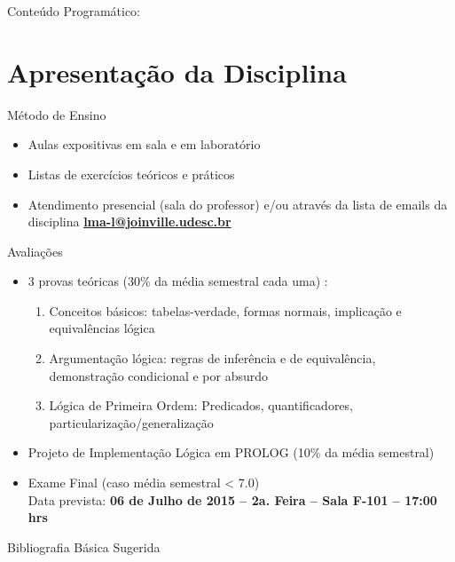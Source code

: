 
\begin{frame}[t,plain]
\titlepage
\end{frame}

\begin{frame}
	Conteúdo Programático:
	\tableofcontents
\end{frame}

\section{Apresentação da Disciplina} %

\begin{frame}[t]{Método de Ensino} %
\begin{itemize}
	\item Aulas expositivas em sala e em laboratório
	\item Listas de exercícios teóricos e práticos
	\item Atendimento presencial (sala do professor) e/ou através da lista de emails da disciplina {\bf \url{lma-l@joinville.udesc.br}}
\end{itemize}
\end{frame}

\begin{frame}[t]{Avaliações} %
	\begin{itemize}
		\item 3 provas teóricas (30\% da média semestral cada uma)  \cite{edgar_2000, nunes_2002}: 
		   \begin{enumerate}
		   \item Conceitos básicos: tabelas-verdade, formas normais, implicação e equivalências lógica
		   \item Argumentação lógica: regras de inferência e de equivalência, demonstração condicional e por absurdo
	  	   \item Lógica de Primeira Ordem: Predicados, quantificadores, particularização/generalização
		   \end{enumerate}
		\item Projeto de Implementação Lógica em PROLOG (10\% da média semestral)
		\item Exame Final (caso média semestral < 7.0)\\ 
		Data prevista: {\bf 06 de Julho de 2015 -- 2a. Feira -- Sala F-101 -- 17:00 hrs}
	\end{itemize}
\end{frame}

\begin{frame}[t]{Bibliografia Básica Sugerida} %
    
\end{frame}


